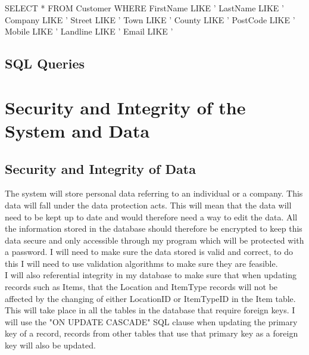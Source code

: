 \begin{sql}
    SELECT * FROM Customer WHERE
	FirstName LIKE '%
	LastName LIKE '%
	Company LIKE '%
	Street LIKE '%
	Town LIKE '%
	County LIKE '%
	PostCode LIKE '%
	Mobile LIKE '%
	Landline LIKE '%
	Email LIKE '%
\end{sql}

\newpage

\subsection{SQL Queries}

\section{Security and Integrity of the System and Data}

\subsection{Security and Integrity of Data}

The system will store personal data referring to an individual or a company. This data will fall under the data protection acts. This will mean that the data will need to be kept up to date and would therefore need a way to edit the data. All the information stored in the database should therefore be encrypted to keep this data secure and only accessible through my program which will be protected with a password. I will need to make sure the data stored is valid and correct, to do this I will need to use validation algorithms to make sure they are feasible.\\

\noindent I will also referential integrity in my database to make sure that when updating records such as Items, that the Location and ItemType records will not be affected by the changing of either LocationID or ItemTypeID in the Item table. This will take place in all the tables in the database that require foreign keys. I will use the "ON UPDATE CASCADE" SQL clause when updating the primary key of a record, records from other tables that use that primary key as a foreign key will also be updated.\\

